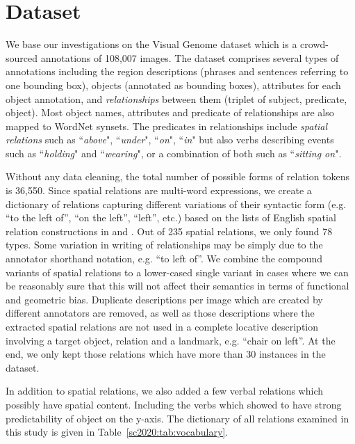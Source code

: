\section{Dataset}\label{sc2020:sec:dataset}

We base our investigations on the Visual Genome dataset
\cite{Krishna:2016aa} which is a crowd-sourced annotations
of 108,007 images. The dataset comprises several types of annotations including the
region descriptions (phrases and sentences referring to one bounding box), objects (annotated as
bounding boxes), attributes for each object annotation, and \emph{relationships} between
them (triplet of subject, predicate, object). Most object names, attributes and predicate of relationships are also mapped to WordNet synsets.
The predicates in relationships
include \emph{spatial relations} such as ``\emph{above}", ``\emph{under}", ``\emph{on}", ``\emph{in}"
but also verbs describing events such as ``\emph{holding}" and ``\emph{wearing}", or a combination of both such as ``\emph{sitting on}".

Without any data cleaning, the total number of possible forms of relation tokens is 36,550. 
Since spatial relations are multi-word expressions, we create a
dictionary of relations capturing different variations of their
syntactic form (e.g. ``to the left of'', ``on the left'', ``left'',
etc.) based on the lists of English spatial relation constructions in
\cite{Landau:1996aa} and \cite{herskovits1986language}. 
Out of 235 spatial relations, we only found 78 types.
Some variation in writing of relationships may be simply due to the
annotator shorthand notation, e.g. ``to left of''. We combine the
compound variants of spatial relations to a lower-cased single variant
in cases where we can be reasonably sure that this will not affect
their semantics in terms of functional and geometric
bias. %
Duplicate descriptions per image which are created by different
annotators are
removed, %
as well as those descriptions where the extracted spatial relations
are not used in a complete locative description involving a target
object, relation and a landmark, e.g. ``chair on left''.
At the end, we only kept those relations which have more than 30 instances in the dataset. 

In addition to spatial relations, we also added a few verbal relations which possibly have spatial content.
Including the verbs which \cite{collell2018acquiring} showed to have strong predictability of object on the y-axis. The dictionary of all relations examined in this study is given in Table~\ref{sc2020:tab:vocabulary}.

